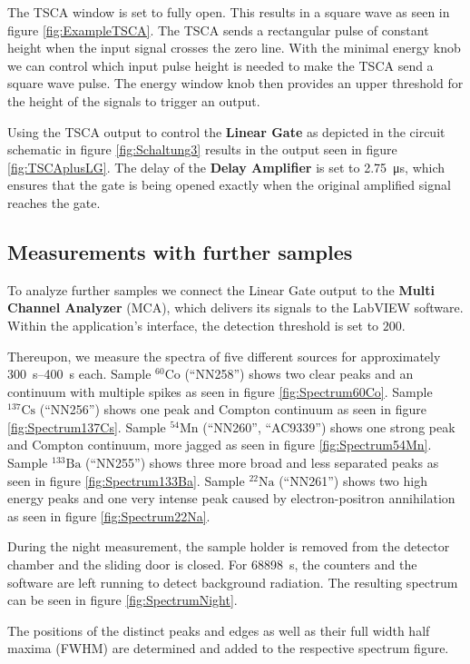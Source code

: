 The TSCA window is set to fully open.
This results in a square wave as seen in figure \ref{fig:ExampleTSCA}.
The TSCA sends a rectangular pulse of constant height when the input signal crosses the zero line.
With the minimal energy knob we can control which input pulse height is needed to make the TSCA send a square wave pulse.
The energy window knob then provides an upper threshold for the height of the signals to trigger an output.
%
\par
%
Using the TSCA output to control the \textbf{Linear Gate} as depicted in the circuit schematic in figure \ref{fig:Schaltung3} results in the output seen in figure \ref{fig:TSCAplusLG}.
The delay of the \textbf{Delay Amplifier} is set to \SI{2.75}{\micro\second}, which ensures that the gate is being opened exactly when the original amplified signal reaches the gate.
%
\subsection{Measurements with further samples}
%
To analyze further samples we connect the Linear Gate output to the \textbf{Multi Channel Analyzer} (MCA), which delivers its signals to the LabVIEW software.
Within the application's interface, the detection threshold is set to $200$.
%
\par
%
Thereupon, we measure the spectra of five different sources for approximately \SIrange{300}{400}{\second} each.
Sample $^{60}\text{Co}$ (\enquote{NN258}) shows two clear peaks and an continuum with multiple spikes as seen in figure \ref{fig:Spectrum60Co}.
Sample $^{137}\text{Cs}$ (\enquote{NN256}) shows one peak and Compton continuum as seen in figure \ref{fig:Spectrum137Cs}.
Sample $^{54}\text{Mn}$ (\enquote{NN260}, \enquote{AC9339}) shows one strong peak and Compton continuum, more jagged as seen in figure \ref{fig:Spectrum54Mn}.
Sample $^{133}\text{Ba}$ (\enquote{NN255}) shows three more broad and less separated peaks as seen in figure \ref{fig:Spectrum133Ba}.
Sample $^{22}\text{Na}$ (\enquote{NN261}) shows two high energy peaks and one very intense peak caused by electron-positron annihilation as seen in figure \ref{fig:Spectrum22Na}.
%
\par
%
During the night measurement, the sample holder is removed from the detector chamber and the sliding door is closed.
For \SI{68898}{\second}, the counters and the software are left running to detect background radiation.
The resulting spectrum can be seen in figure \ref{fig:SpectrumNight}.
%
\par
%
The positions of the distinct peaks and edges as well as their full width half maxima (FWHM) are determined and added to the respective spectrum figure.
%
